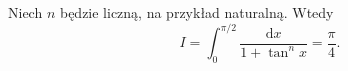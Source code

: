 %

\begin{problem}[pytanie 605673]
    \label{stack_605673}%
    Niech $n$ będzie liczną, na przykład naturalną.
    Wtedy
    \begin{equation}
        I = \int_0^{\pi/2} \frac{\mathrm{d}x}{1 + \tan^n x} = \frac{\pi}{4}.
    \end{equation}
\end{problem}

%
